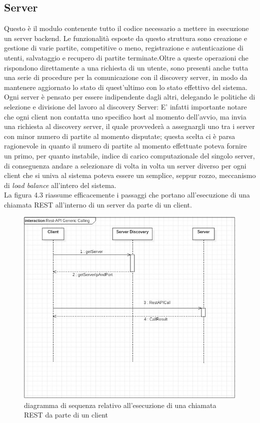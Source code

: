  \subsection {Server}\label{subsec:details:server}
 Questo è il modulo contenente tutto il codice necessario a mettere in esecuzione un server backend. Le funzionalità esposte da questo struttura sono creazione e gestione di varie partite, competitive o meno, registrazione e autenticazione di utenti, salvataggio e recupero di partite terminate.Oltre a queste operazioni che rispondono direttamente a una richiesta di un utente, sono presenti anche tutta una serie di procedure per la comunicazione con il discovery server, in modo da mantenere aggiornato lo stato di quest'ultimo con lo stato effettivo del sistema.\\
 Ogni server è pensato per essere indipendente dagli altri, delegando le politiche di selezione e divisione del lavoro al discovery Server:
 E' infatti importante notare che ogni client non contatta uno specifico host al momento dell'avvio, ma invia una richiesta al discovery server, il quale provvederà a assegnargli uno tra i server con minor numero di partite al momento disputate; questa scelta ci è parsa ragionevole in quanto il numero di partite al momento effettuate poteva fornire un primo, per quanto instabile, indice di carico computazionale del singolo server, di conseguenza andare a selezionare di volta in volta un server diverso per ogni client che si univa al sistema poteva essere un semplice, seppur rozzo, meccanismo di \textit{load balance} all'intero del sistema.\\
 La figura 4.3 riassume efficacemente i passaggi che portano all'esecuzione di una chiamata REST all'interno di un server da parte di un client.\\

 \begin{figure}[H]
   \includegraphics[width=\textwidth,height=\textheight,keepaspectratio]{restAPICall}
    \caption{diagramma di sequenza relativo all'esecuzione di una chiamata REST da parte di un client}
 \end{figure}

